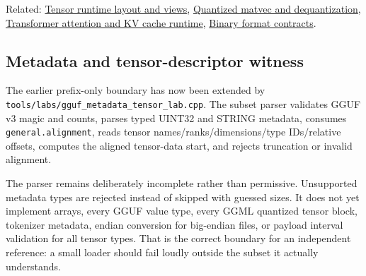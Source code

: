 Related: \hyperref[appendix-cebadf3106d1]{Tensor runtime layout and views}, \hyperref[appendix-241c0e42ac2d]{Quantized matvec and dequantization}, \hyperref[appendix-ea2dadd21ce5]{Transformer attention and KV cache runtime}, \hyperref[appendix-590bbb2424c1]{Binary format contracts}.

\subsection{Metadata and tensor-descriptor witness}\label{metadata-and-tensor-descriptor-witness}

The earlier prefix-only boundary has now been extended by \texttt{tools/labs/gguf\_metadata\_tensor\_lab.cpp}. The subset parser validates GGUF v3 magic and counts, parses typed UINT32 and STRING metadata, consumes \texttt{general.alignment}, reads tensor names/ranks/dimensions/type IDs/relative offsets, computes the aligned tensor-data start, and rejects truncation or invalid alignment.

The parser remains deliberately incomplete rather than permissive. Unsupported metadata types are rejected instead of skipped with guessed sizes. It does not yet implement arrays, every GGUF value type, every GGML quantized tensor block, tokenizer metadata, endian conversion for big-endian files, or payload interval validation for all tensor types. That is the correct boundary for an independent reference: a small loader should fail loudly outside the subset it actually understands.
